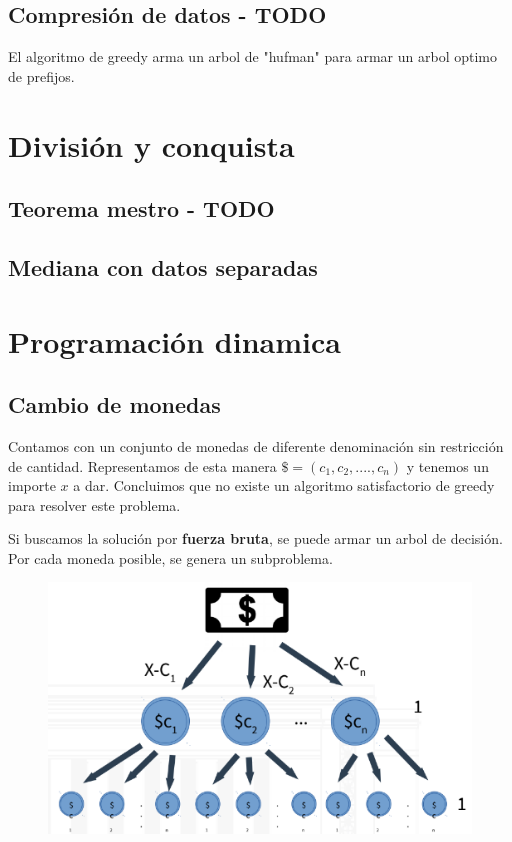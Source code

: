 \documentclass{article}
\begin{document}
\subsection{Compresión de datos - TODO}

El algoritmo de greedy arma un arbol de "hufman" para armar un arbol optimo de prefijos.

\section{División y conquista}

\subsection{Teorema mestro - TODO}


\subsection{Mediana con datos separadas}




\newpage
\section{Programación dinamica}

\subsection{Cambio de monedas}

Contamos con un conjunto de monedas de diferente denominación sin restricción de cantidad. 
Representamos de esta manera \(\$=(c_1,c_2,....,c_n)\) y tenemos un importe \(x\) a dar. 
Concluimos que no existe un algoritmo satisfactorio de greedy para resolver este problema.

Si buscamos la solución por \textbf{fuerza bruta}, se puede armar un arbol de decisión. 
Por cada moneda posible, se genera un subproblema. 

\begin{figure}[h!]
    \includegraphics[width=\linewidth]{imagenes/dinamico-arbol-moneda.png}
\end{figure}
\end{document}
